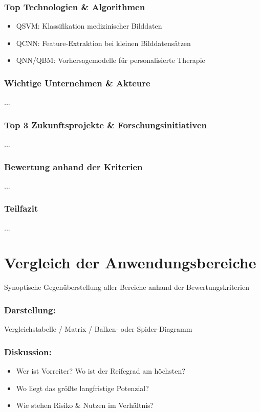 \subsubsection*{Top Technologien \& Algorithmen}
\begin{itemize}
    \item QSVM: Klassifikation medizinischer Bilddaten
    \item QCNN: Feature-Extraktion bei kleinen Bilddatensätzen
    \item QNN/QBM: Vorhersagemodelle für personalisierte Therapie
\end{itemize}

\subsubsection*{Wichtige Unternehmen \& Akteure}
...

\subsubsection*{Top 3 Zukunftsprojekte \& Forschungsinitiativen}
...

\subsubsection*{Bewertung anhand der Kriterien}
...

\subsubsection*{Teilfazit}
...


\section{Vergleich der Anwendungsbereiche}
Synoptische Gegenüberstellung aller Bereiche anhand der Bewertungskriterien\\

\subsubsection*{Darstellung:}
Vergleichstabelle / Matrix / Balken- oder Spider-Diagramm \\

\subsubsection*{Diskussion:}
\begin{itemize}
    \item Wer ist Vorreiter? Wo ist der Reifegrad am höchsten?
    \item Wo liegt das größte langfristige Potenzial?
    \item Wie stehen Risiko \& Nutzen im Verhältnis?
\end{itemize}


